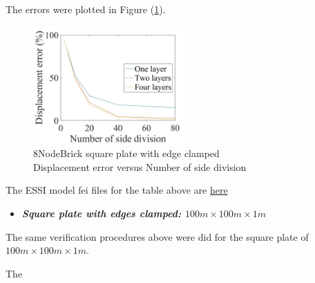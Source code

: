 \documentclass[fleqn,11pt,letter]{article}
\begin{document}
The errors were plotted in Figure (\ref{fig 8NodeBrick square plate with edge clamped}).
\begin{figure}[H]
    \centering
    \includegraphics[width=6cm]{../Figure_files/8NodeBrick/error8brick_square_plate_clamped.jpeg}
  \captionsetup{justification=centering,margin=3cm}
  \caption{8NodeBrick square plate with edge clamped\\
      Displacement error   versus   Number of side division}
  \label{fig 8NodeBrick square plate with edge clamped}
\end{figure}



The ESSI model fei files for the table above are \href{https://github.com/yuan-energy/ESSI_Verification/blob/master/8NodeBrick/square_plate_clamped/square_plate_clamped.tar.gz?raw=true}{here}




\newpage
\begin{itemize}
  \item \textbf{\emph{Square plate with edges clamped: $100m \times 100m \times 1m$}}
\end{itemize}

The same verification procedures above were did for the square plate of $100m \times 100m \times 1m$. 

The 









\end{document}
